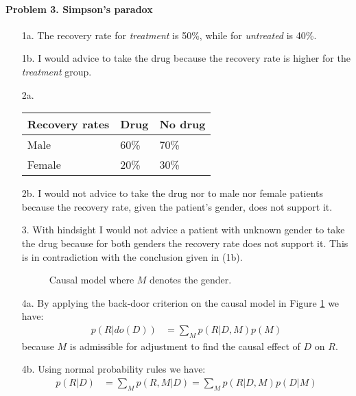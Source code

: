 \documentclass{amsmlaj}
\begin{document}
\paragraph{Problem 3. Simpson's paradox}
\begin{sol}
	\begin{itemize}
		\item[1a.] The recovery rate for \textit{treatment} is 50\%, while for
			\textit{untreated} is 40\%.
		\item[1b.] I would advice to take the drug because the recovery rate is
			higher for the \textit{treatment} group.
		\item[2a.]
			\begin{tabular}[H]{ l | l | l }
				\textbf{Recovery rates} & Drug & No drug \\
				\hline
				Male & 60\% & 70\% \\
				Female & 20\% & 30\%
			\end{tabular}
		\item[2b.] I would not advice to take the drug nor to male nor
			female patients because the recovery rate, given the patient's gender,
			does not support it.
		\item[3.] With hindsight I would not advice a patient with unknown gender to
			take the drug because for both genders the recovery rate does not support
			it. This is in contradiction with the conclusion given in (1b).
		\begin{figure}[h]
			\centering
			\caption{Causal model where $M$ denotes the gender.}
			\label{fig:p3i}
		\end{figure}
		\item[4a.] By applying the back-door criterion on the causal model in Figure
			\ref{fig:p3i} we have:
			\begin{align}
				p(R|do(D)) &= \sum_M p(R|D,M)p(M)
			\end{align}
			because $M$ is admissible for adjustment to find the causal effect of $D$ on $R$.
		\item[4b.] Using normal probability rules we have:
			\begin{align}
				p(R|D) &= \sum_M p(R,M|D) = \sum_M p(R|D,M)p(D|M)
			\end{align}

\end{itemize}
\end{sol}
\end{document}
